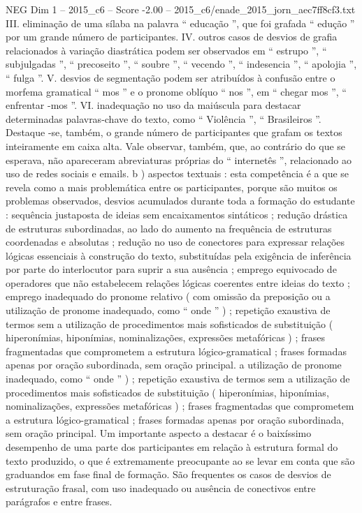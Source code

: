 \begin{textsample}{NEG Dim 1 – 2015\_c6 – Score -2.00 – 2015\_c6/enade\_2015\_jorn\_aec7ff8cf3.txt}
III. eliminação de uma sílaba na palavra “ educação ”, que foi grafada “ edução ” por um grande número de participantes.
IV. outros casos de desvios de grafia relacionados à variação diastrática podem ser observados em “ estrupo ”, “ subjulgadas ”, “ precoseito ”, “ soubre ”, “ vecendo ”, “ indesencia ”, “ apolojia ”, “ fulga ”.
V. desvios de segmentação podem ser atribuídos à confusão entre o morfema gramatical “ mos ” e o pronome oblíquo “ nos ”, em “ chegar mos ”, “ enfrentar -mos ”.
VI. inadequação no uso da maiúscula para destacar determinadas palavras-chave do texto, como “ Violência ”, “ Brasileiros ”.
Destaque -se, também, o grande número de participantes que grafam os textos inteiramente em caixa alta.
Vale observar, também, que, ao contrário do que se esperava, não apareceram abreviaturas próprias do “ internetês ”, relacionado ao uso de redes sociais e emails. b ) aspectos textuais : esta competência é a que se revela como a mais problemática entre os participantes, porque são muitos os problemas observados, desvios acumulados durante toda a formação do estudante : sequência justaposta de ideias sem encaixamentos sintáticos ; redução drástica de estruturas subordinadas, ao lado do aumento na frequência de estruturas coordenadas e absolutas ; redução no uso de conectores para expressar relações lógicas essenciais à construção do texto, substituídas pela exigência de inferência por parte do interlocutor para suprir a sua ausência ; emprego equivocado de operadores que não estabelecem relações lógicas coerentes entre ideias do texto ; emprego inadequado do pronome relativo ( com omissão da preposição ou a utilização de pronome inadequado, como “ onde ” ) ; repetição exaustiva de termos sem a utilização de procedimentos mais sofisticados de substituição ( hiperonímias, hiponímias, nominalizações, expressões metafóricas ) ; frases fragmentadas que comprometem a estrutura lógico-gramatical ; frases formadas apenas por oração subordinada, sem oração principal. a utilização de pronome inadequado, como “ onde ” ) ; repetição exaustiva de termos sem a utilização de procedimentos mais sofisticados de substituição ( hiperonímias, hiponímias, nominalizações, expressões metafóricas ) ; frases fragmentadas que comprometem a estrutura lógico-gramatical ; frases formadas apenas por oração subordinada, sem oração principal.
Um importante aspecto a destacar é o baixíssimo desempenho de uma parte dos participantes em relação à estrutura formal do texto produzido, o que é extremamente preocupante ao se levar em conta que são graduandos em fase final de formação.
São frequentes os casos de desvios de estruturação frasal, com uso inadequado ou ausência de conectivos entre parágrafos e entre frases.

\end{textsample}

